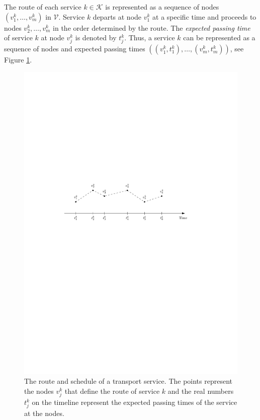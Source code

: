 \documentclass[dissertation,draft*]{aaltoseries}
\begin{document}
The route of each service $k \in \mathcal{K}$ is represented as a sequence of nodes $(v_1^k,\ldots,v_m^k)$ in $\mathcal{V}$. 
Service $k$ departs at node $v_1^k$ at a specific time and proceeds to nodes $v_2^k, \ldots,v_m^k$ in the order determined by the route.
The \emph{expected passing time} of service $k$ at node $v_j^k$ is denoted by $t_j^k$.
Thus, a service $k$ can be represented as a sequence of nodes and expected passing
times $((v_1^k, t_1^k), \ldots, (v_m^k, t_m^k))$, see Figure \ref{stokvsdet02}.

\begin{figure}[ht]
\begin{center}
\includegraphics[width=0.8\columnwidth]{stokvsdet02b}
\end{center}
\caption{The route and schedule of a transport service. The points represent the nodes $v_j^k$ that define 
the route of service $k$ and the real numbers $t_j^k$ on the timeline represent the expected passing
times of the service at the nodes.}
\label{stokvsdet02}
\end{figure}
\end{document}
